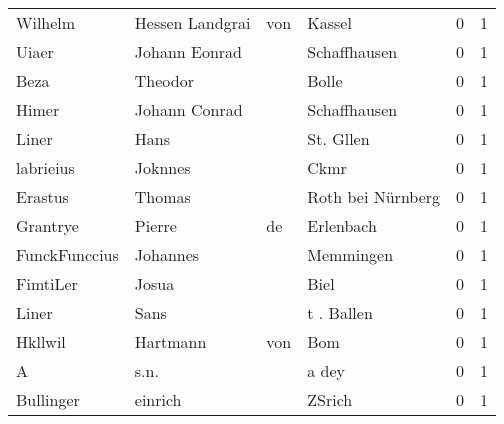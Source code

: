 \begin{tabular}{llllrr}
                  Wilhelm &                    Hessen Landgrai &         von &                                      Kassel &          0 &         1 \\
                    Uiaer &                      Johann Eonrad &             &                                Schaffhausen &          0 &         1 \\
                     Beza &                            Theodor &             &                                       Bolle &          0 &         1 \\
                    Himer &                      Johann Conrad &             &                                Schaffhausen &          0 &         1 \\
                    Liner &                               Hans &             &                                   St. Gllen &          0 &         1 \\
                labrieius &                            Joknnes &             &                                        Ckmr &          0 &         1 \\
                  Erastus &                             Thomas &             &                           Roth bei Nürnberg &          0 &         1 \\
                 Grantrye &                             Pierre &          de &                                   Erlenbach &          0 &         1 \\
            FunckFunccius &                           Johannes &             &                                   Memmingen &          0 &         1 \\
                 FimtiLer &                              Josua &             &                                        Biel &          0 &         1 \\
                    Liner &                               Sans &             &                                  t . Ballen &          0 &         1 \\
                  Hkllwil &                           Hartmann &         von &                                         Bom &          0 &         1 \\
                        A &                               s.n. &             &                                       a dey &          0 &         1 \\
                Bullinger &                            einrich &             &                                      ZSrich &          0 &         1 \\

\end{tabular}
